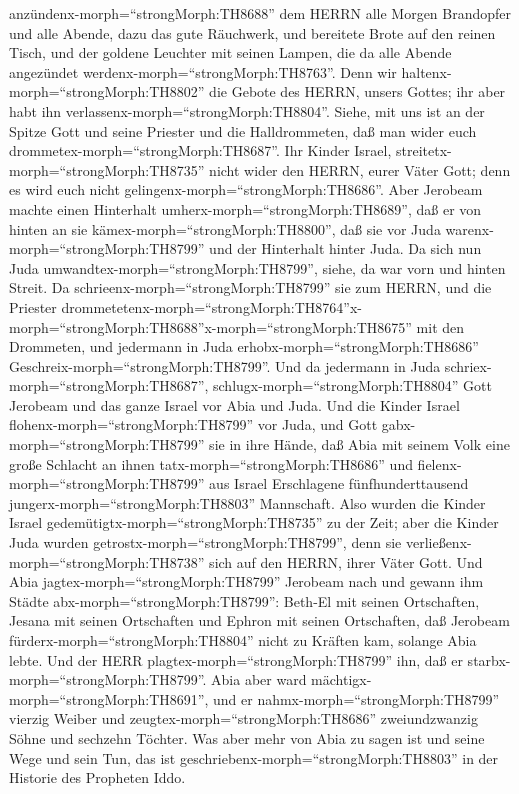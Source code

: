 anzündenx-morph=``strongMorph:TH8688'' dem HERRN alle Morgen Brandopfer
und alle Abende, dazu das gute Räuchwerk, und bereitete Brote auf den
reinen Tisch, und der goldene Leuchter mit seinen Lampen, die da alle
Abende angezündet werdenx-morph=``strongMorph:TH8763''. Denn wir
haltenx-morph=``strongMorph:TH8802'' die Gebote des HERRN, unsers
Gottes; ihr aber habt ihn verlassenx-morph=``strongMorph:TH8804''.
 Siehe, mit uns ist an der Spitze Gott und seine Priester
und die Halldrommeten, daß man wider euch
drommetex-morph=``strongMorph:TH8687''. Ihr Kinder Israel,
streitetx-morph=``strongMorph:TH8735'' nicht wider den HERRN, eurer
Väter Gott; denn es wird euch nicht
gelingenx-morph=``strongMorph:TH8686''.  Aber Jerobeam
machte einen Hinterhalt umherx-morph=``strongMorph:TH8689'', daß er von
hinten an sie kämex-morph=``strongMorph:TH8800'', daß sie vor Juda
warenx-morph=``strongMorph:TH8799'' und der Hinterhalt hinter Juda.
 Da sich nun Juda umwandtex-morph=``strongMorph:TH8799'',
siehe, da war vorn und hinten Streit. Da
schrieenx-morph=``strongMorph:TH8799'' sie zum HERRN, und die Priester
drommetetenx-morph=``strongMorph:TH8764''x-morph=``strongMorph:TH8688''\textbar x-morph=``strongMorph:TH8675''
mit den Drommeten,  und jedermann in Juda
erhobx-morph=``strongMorph:TH8686''
Geschreix-morph=``strongMorph:TH8799''. Und da jedermann in Juda
schriex-morph=``strongMorph:TH8687'',
schlugx-morph=``strongMorph:TH8804'' Gott Jerobeam und das ganze Israel
vor Abia und Juda.  Und die Kinder Israel
flohenx-morph=``strongMorph:TH8799'' vor Juda, und Gott
gabx-morph=``strongMorph:TH8799'' sie in ihre Hände,  daß
Abia mit seinem Volk eine große Schlacht an ihnen
tatx-morph=``strongMorph:TH8686'' und
fielenx-morph=``strongMorph:TH8799'' aus Israel Erschlagene
fünfhunderttausend jungerx-morph=``strongMorph:TH8803'' Mannschaft.
 Also wurden die Kinder Israel
gedemütigtx-morph=``strongMorph:TH8735'' zu der Zeit; aber die Kinder
Juda wurden getrostx-morph=``strongMorph:TH8799'', denn sie
verließenx-morph=``strongMorph:TH8738'' sich auf den HERRN, ihrer Väter
Gott.  Und Abia jagtex-morph=``strongMorph:TH8799''
Jerobeam nach und gewann ihm Städte abx-morph=``strongMorph:TH8799'':
Beth-El mit seinen Ortschaften, Jesana mit seinen Ortschaften und Ephron
mit seinen Ortschaften,  daß Jerobeam
fürderx-morph=``strongMorph:TH8804'' nicht zu Kräften kam, solange Abia
lebte. Und der HERR plagtex-morph=``strongMorph:TH8799'' ihn, daß er
starbx-morph=``strongMorph:TH8799''.  Abia aber ward
mächtigx-morph=``strongMorph:TH8691'', und er
nahmx-morph=``strongMorph:TH8799'' vierzig Weiber und
zeugtex-morph=``strongMorph:TH8686'' zweiundzwanzig Söhne und sechzehn
Töchter.  Was aber mehr von Abia zu sagen ist und seine
Wege und sein Tun, das ist geschriebenx-morph=``strongMorph:TH8803'' in
der Historie des Propheten Iddo.

